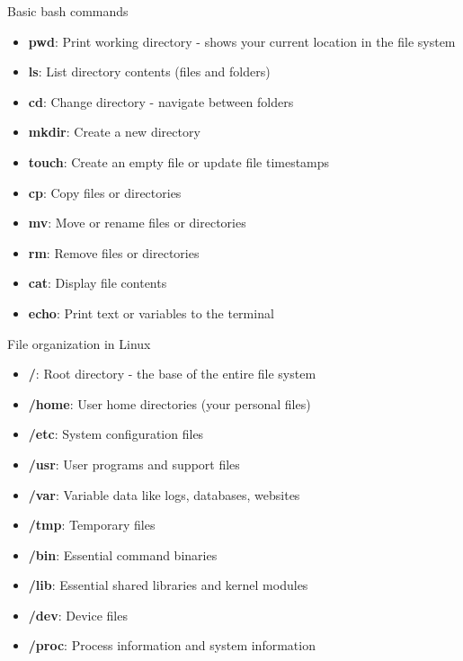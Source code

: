 \begin{frame}[fragile]{Basic bash commands}
	\begin{itemize}
		\item \textbf{pwd}: Print working directory - shows your current location in the file system
		\item \textbf{ls}: List directory contents (files and folders)
		\item \textbf{cd}: Change directory - navigate between folders
		\item \textbf{mkdir}: Create a new directory
		\item \textbf{touch}: Create an empty file or update file timestamps
		\item \textbf{cp}: Copy files or directories
		\item \textbf{mv}: Move or rename files or directories
		\item \textbf{rm}: Remove files or directories
		\item \textbf{cat}: Display file contents
		\item \textbf{echo}: Print text or variables to the terminal
	\end{itemize}
\end{frame}

\begin{frame}[fragile]{File organization in Linux}
	\begin{itemize}
		\item \textbf{/}: Root directory - the base of the entire file system
		\item \textbf{/home}: User home directories (your personal files)
		\item \textbf{/etc}: System configuration files
		\item \textbf{/usr}: User programs and support files
		\item \textbf{/var}: Variable data like logs, databases, websites
		\item \textbf{/tmp}: Temporary files
		\item \textbf{/bin}: Essential command binaries
		\item \textbf{/lib}: Essential shared libraries and kernel modules
		\item \textbf{/dev}: Device files
		\item \textbf{/proc}: Process information and system information
	\end{itemize}
\end{frame}

